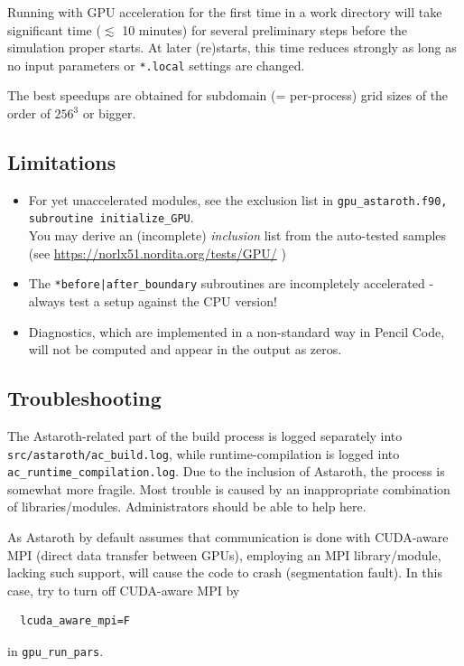 \documentclass[a4paper,12pt]{article}
\newcommand{\command}[1]{\texttt{#1}}
\newcommand{\code}[1]{\texttt{#1}}
\begin{document}
Running with GPU acceleration for the first time in a work directory will take significant time ($\lesssim$ 10 minutes) for several preliminary steps before the simulation proper starts. At later (re)starts, this time reduces strongly as long as no input parameters or \command{*.local} settings are changed.

The best speedups are obtained for subdomain (= per-process) grid sizes of the order of $256^3$ or bigger. 

\subsection{Limitations}
\begin{itemize}
\item For yet unaccelerated modules, see the exclusion list in \command{gpu\_astaroth.f90, subroutine initialize\_GPU}.\\
         You may derive an (incomplete) {\it inclusion} list from the auto-tested samples (see \url{https://norlx51.nordita.org/tests/GPU/} )
\item The \command{*before|after\_boundary} subroutines are incompletely accelerated - always test a setup against the CPU version!
\item Diagnostics, which are implemented in a non-standard way in Pencil Code, will not be computed and appear in the output as zeros.
\end{itemize}

\subsection{Troubleshooting}
The Astaroth-related part of the build process is logged separately into \code{src/astaroth/ac\_build.log}, while runtime-compilation is logged into \code{ac\_runtime\_compilation.log}.
Due to the inclusion of Astaroth, the process is somewhat more fragile. 
Most trouble is caused by an inappropriate combination of libraries/modules.
Administrators should be able to help here.

As Astaroth by default assumes that communication is done with CUDA-aware MPI (direct data transfer between GPUs),
employing an MPI library/module, lacking such support, will cause the code to crash (segmentation fault). 
In this case, try to turn off CUDA-aware MPI by
\begin{verbatim}
  lcuda_aware_mpi=F
\end{verbatim}
in \code{gpu\_run\_pars}.
\end{document}
